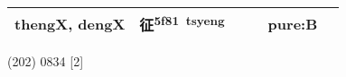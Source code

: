 \documentclass[14pt,a4paper]{scrartcl}
\begin{document}
\begin{longtable}[c]{@{}llllll@{}}
\begin{minipage}[t]{0.14\columnwidth}
thengX, dengX
\strut\end{minipage} &
\begin{minipage}[t]{0.14\columnwidth}\raggedright\strut
征\textsuperscript{5f81~tsyeng}
\strut\end{minipage} &
\begin{minipage}[t]{0.14\columnwidth}\raggedright\strut
\strut\end{minipage} &
\begin{minipage}[t]{0.14\columnwidth}\raggedright\strut
\strut\end{minipage} &
\begin{minipage}[t]{0.14\columnwidth}\raggedright\strut
pure:B
\strut\end{minipage}\tabularnewline
\bottomrule
\end{longtable}

(202) 0834 {[}2{]}
\end{document}

